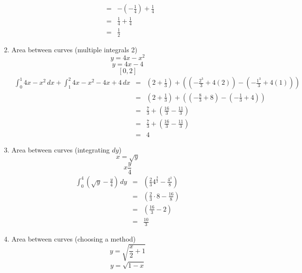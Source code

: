 \documentclass{article}
\begin{document}
\begin{enumerate}
\begin{eqnarray}
                                                             &=& - \left(-\frac{1}{4}\right) + \frac{1}{4} \\
                                                             &=& \frac{1}{4} + \frac{1}{4} \\
                                                             &=& \frac{1}{2}
        \end{eqnarray}
    \item Area between curves (multiple integrals 2)
        $$y = 4x - x^2$$
        $$y = 4x - 4$$
        $$[0,2]$$
        \begin{eqnarray}
            \int_0^1{4x - x^2\,dx} + \int_1^2{4x - x^2 - 4x + 4\,dx} &=& \left(2 + \frac{1}{3}\right) + \left(\left(-\frac{2^3}{3} + 4(2)\right) - \left(-\frac{1^3}{3} + 4(1)\right)\right) \\
                                                                     &=& \left(2 + \frac{1}{3}\right) + \left(\left(-\frac{8}{3} + 8\right) - \left(-\frac{1}{3} + 4\right)\right) \\
                                                                     &=& \frac{7}{3} + \left(\frac{16}{3} - \frac{11}{3}\right) \\
                                                                     &=& \frac{7}{3} + \left(\frac{16}{3} - \frac{11}{3}\right) \\
                                                                     &=& 4
        \end{eqnarray}
    \item Area between curves (integrating $dy$)
        $$x = \sqrt{y}$$
        $$x \frac{y}{4}$$
        \begin{eqnarray}
            \int_0^4{\left(\sqrt{y} - \frac{y}{4}\right)\,dy} &=& \left(\frac{2}{3}4^{\frac{3}{2}} - \frac{4^2}{8}\right) \\
                                                              &=& \left(\frac{2}{3}\cdot 8 - \frac{16}{8}\right) \\
                                                              &=& \left(\frac{16}{3} - 2\right) \\
                                                              &=& \frac{10}{3}
        \end{eqnarray}
    \item Area between curves (choosing a method)
        $$y = \sqrt{\frac{x}{2} + 1}$$
        $$y = \sqrt{1 - x}$$
        \begin{eqnarray}

\end{eqnarray}
\end{enumerate}
\end{document}
